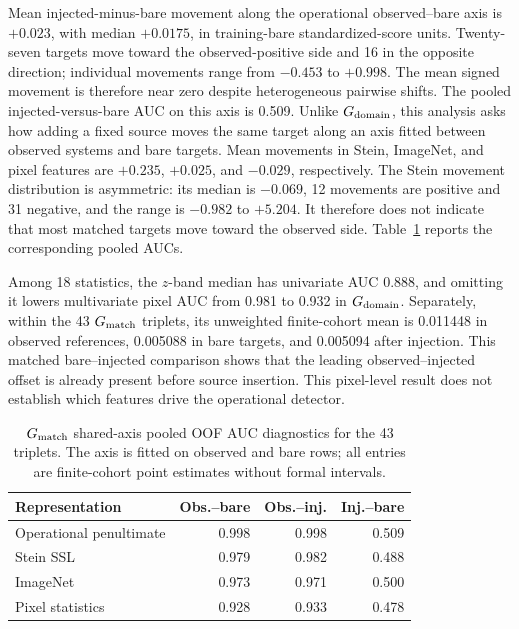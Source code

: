 Mean injected-minus-bare movement along the operational observed--bare axis is
\(+0.023\), with median \(+0.0175\), in training-bare standardized-score
units. Twenty-seven targets move toward the observed-positive side and 16 in the
opposite direction; individual movements range from \(-0.453\) to \(+0.998\).
The mean signed movement is therefore near zero despite heterogeneous
pairwise shifts. The pooled injected-versus-bare AUC on this axis is 0.509.
Unlike \(G_{\rm domain}\), this analysis asks how adding a fixed source moves
the same target along an axis fitted between observed systems and bare
targets. Mean movements in Stein,
ImageNet, and pixel features are \(+0.235\), \(+0.025\), and \(-0.029\),
respectively. The Stein movement distribution is asymmetric: its median is
\(-0.069\), 12 movements are positive and 31 negative, and the range is
\(-0.982\) to \(+5.204\). It therefore does not indicate that most matched
targets move toward the observed side. Table~\ref{tab:gmatch_final} reports
the corresponding pooled AUCs.

Among 18 statistics, the \(z\)-band median has univariate AUC 0.888, and
omitting it lowers multivariate pixel AUC from 0.981 to 0.932 in
\(G_{\rm domain}\). Separately, within the 43 \(G_{\rm match}\) triplets, its
unweighted finite-cohort mean is 0.011448 in observed references, 0.005088 in
bare targets, and 0.005094 after injection. This matched bare--injected
comparison shows that the leading observed--injected offset is already present
before source insertion. This pixel-level result does not establish which
features drive the operational detector.

\begin{table}
\caption{\(G_{\rm match}\) shared-axis pooled OOF AUC diagnostics for the 43
triplets. The axis is fitted on observed and bare rows; all entries are
finite-cohort point estimates without formal intervals.}
\label{tab:gmatch_final}
\centering
\small
\setlength{\tabcolsep}{4pt}
\begin{tabular}{lrrr}
\toprule
Representation & Obs.--bare & Obs.--inj. & Inj.--bare \\
\midrule
Operational penultimate & 0.998 & 0.998 & 0.509 \\
Stein SSL & 0.979 & 0.982 & 0.488 \\
ImageNet & 0.973 & 0.971 & 0.500 \\
Pixel statistics & 0.928 & 0.933 & 0.478 \\
\bottomrule
\end{tabular}
\end{table}

